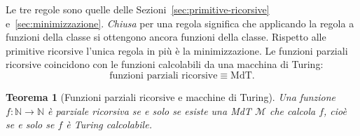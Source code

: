 \documentclass[a4paper, 11pt, oneside]{book}
\theoremstyle{formale}
\newtheorem{theorem}{Teorema}
\begin{document}
    Le tre regole sono quelle delle Sezioni~\ref{sec:primitive-ricorsive}
    e~\ref{sec:minimizzazione}. \emph{Chiusa} per una regola significa che applicando
    la regola a funzioni della classe si ottengono ancora funzioni della classe.
    Rispetto alle primitive ricorsive l'unica regola in pi\`u \`e la minimizzazione. Le
    funzioni parziali ricorsive coincidono con le funzioni calcolabili da una macchina
    di Turing:
    \begin{equation*}
        \text{funzioni parziali ricorsive} \equiv \text{MdT}.
    \end{equation*}

    \begin{theorem}[Funzioni parziali ricorsive e macchine di Turing]
        \label{thm:parziali-mdt}
        Una funzione $f \colon \mathbb{N} \to \mathbb{N}$ \`e parziale ricorsiva se e
        solo se esiste una MdT $\mathcal{M}$ che calcola $f$, cio\`e se e solo se $f$
        \`e Turing calcolabile.
    \end{theorem}
\end{document}

